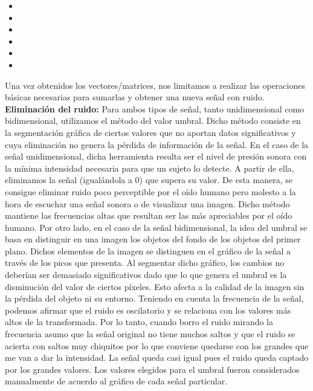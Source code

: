 \documentclass[10pt, a4paper]{article}
\begin{document}
\begin{itemize}
 \begin{itemize}
 \item \center{[-1, 1]}
 \item \center{[-5, 5]}
 \item \center{[-15, 15]}
 \item \center{[-30, 30]}
 \item \center{[-50, 50]}
 \item \center{[-60, 60]}
 \end{itemize}
 
Una vez obtenidos los vectores/matrices, nos limitamos a realizar las operaciones básicas necesarias para sumarlas y obtener una nueva señal con ruido.\newline
\newline
\large{\textbf{Eliminación del ruido:}}\newline
Para ambos tipos de señal, tanto unidimensional como bidimensional, utilizamos el método del valor umbral. Dicho método consiste en la segmentación gráfica de ciertos valores que no aportan datos significativos y cuya eliminación no genera la pérdida de información de la señal.\newline
\newline
En el caso de la señal unidimensional, dicha herramienta resulta ser el nivel de presión sonora con la mínima intensidad necesaria para que un sujeto lo detecte. A partir de ella, eliminamos la señal (igualándola a 0) que supera su valor. De esta manera, se consigue eliminar ruido poco perceptible por el oído humano pero molesto a la hora de escuchar una señal sonora o de visualizar una imagen. Dicho método mantiene las frecuencias altas que resultan ser las más apreciables por el oído humano. \newline
\newline
Por otro lado, en el caso de la señal bidimensional, la idea del umbral se basa en distinguir en una imagen los objetos del fondo de los objetos del primer plano. Dichos elementos de la imagen se distinguen en el gráfico de la señal a través de los picos que presenta. Al segmentar dicho gráfico, los cambios no deberían ser demasiado significativos dado que lo que genera el umbral es la disminución del valor de ciertos píxeles. Esto afecta a la calidad de la imagen sin la pérdida del objeto ni su entorno.\newline
\newline
Teniendo en cuenta la frecuencia de la señal, podemos afirmar que el ruido es oscilatorio y se relaciona con los valores más altos de la transformada. Por lo tanto, cuando borro el ruido mirando la frecuencia asumo que la señal original no tiene muchos saltos y que el ruido se acierta con saltos muy chiquitos por lo que conviene quedarse con los grandes que me van a dar la intensidad. La señal queda casi igual pues el ruido queda captado por los grandes valores.\newline
Los valores elegidos para el umbral fueron considerados manualmente de acuerdo al gráfico de cada señal particular.


\end{itemize}
\end{document}
